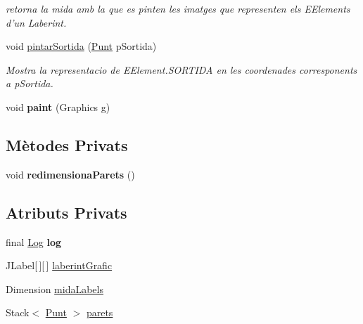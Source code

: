 \begin{DoxyCompactItemize}
\begin{DoxyCompactList}\small\item\em retorna la mida amb la que es pinten les imatges que representen els E\+Elements d'un Laberint. \end{DoxyCompactList}\item 
void \hyperlink{classinterficie_1_1_p_laberint_adc6caa1f1d91892ea56077d2facac8ec}{pintar\+Sortida} (\hyperlink{classlogica_1_1_punt}{Punt} p\+Sortida)
\begin{DoxyCompactList}\small\item\em Mostra la representacio de E\+Element.\+S\+O\+R\+T\+I\+D\+A en les coordenades corresponents a p\+Sortida. \end{DoxyCompactList}\item 
\hypertarget{classinterficie_1_1_p_laberint_af8eb42e37de9874c0810fae1d6595ba4}{void {\bfseries paint} (Graphics g)}\label{classinterficie_1_1_p_laberint_af8eb42e37de9874c0810fae1d6595ba4}

\end{DoxyCompactItemize}
\subsection*{Mètodes Privats}
\begin{DoxyCompactItemize}
\item 
\hypertarget{classinterficie_1_1_p_laberint_a5b062601f1e923d8c927f4175143ded5}{void {\bfseries redimensiona\+Parets} ()}\label{classinterficie_1_1_p_laberint_a5b062601f1e923d8c927f4175143ded5}

\end{DoxyCompactItemize}
\subsection*{Atributs Privats}
\begin{DoxyCompactItemize}
\item 
\hypertarget{classinterficie_1_1_p_laberint_aad412744c351b24fce61ff54c3d39e7c}{final \hyperlink{classlogica_1_1log_1_1_log}{Log} {\bfseries log}}\label{classinterficie_1_1_p_laberint_aad412744c351b24fce61ff54c3d39e7c}

\item 
J\+Label\mbox{[}$\,$\mbox{]}\mbox{[}$\,$\mbox{]} \hyperlink{classinterficie_1_1_p_laberint_a7c0d3cba083c83e635532b8808affa94}{laberint\+Grafic}
\item 
Dimension \hyperlink{classinterficie_1_1_p_laberint_a9e8ee2e2a3fbf095be55f50f9d430e15}{mida\+Labels}
\item 
Stack$<$ \hyperlink{classlogica_1_1_punt}{Punt} $>$ \hyperlink{classinterficie_1_1_p_laberint_a45a890d19dc7c46a3437444e48cede0d}{parets}
\end{DoxyCompactItemize}
